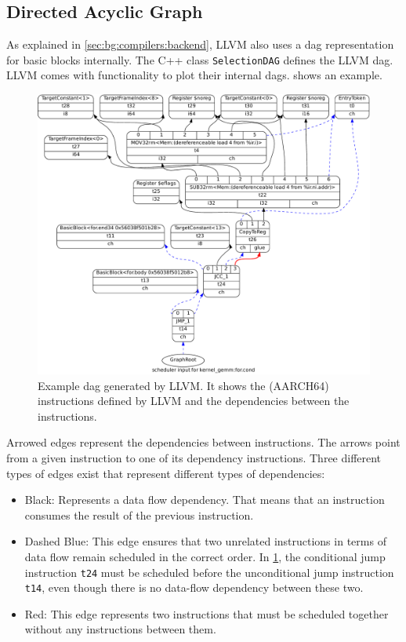 \subsection{Directed Acyclic Graph}
As explained in \cref{sec:bg:compilers:backend}, LLVM also uses a \ac{dag} representation for basic blocks internally.
The C++ class \lstinline|SelectionDAG| defines the LLVM \ac{dag}.
LLVM comes with functionality to plot their internal \acp{dag}.
 shows an example.
\begin{figure}
    \centering
    \includegraphics[width=\textwidth]{img/example-dag-crop.pdf}
    \caption[Example  generated by LLVM]{Example \ac{dag} generated by LLVM. It shows the (AARCH64) instructions defined by LLVM and the dependencies between the instructions.}
    \label{fig:bg:llvm-dag}
\end{figure}

Arrowed edges represent the dependencies between instructions.
The arrows point from a given instruction to one of its dependency instructions.
Three different types of edges exist that represent different types of dependencies:
\begin{itemize}
    \item Black: Represents a data flow dependency. That means that an instruction consumes the result of the previous instruction.
    \item Dashed Blue: This edge ensures that two unrelated instructions in terms of data flow remain scheduled in the correct order.
        In \cref{fig:bg:llvm-dag}, the conditional jump instruction \lstinline|t24| must be scheduled before the unconditional jump instruction \lstinline|t14|, even though there is no data-flow dependency between these two.
    \item Red: This edge represents two instructions that must be scheduled together without any instructions between them.
\end{itemize}

